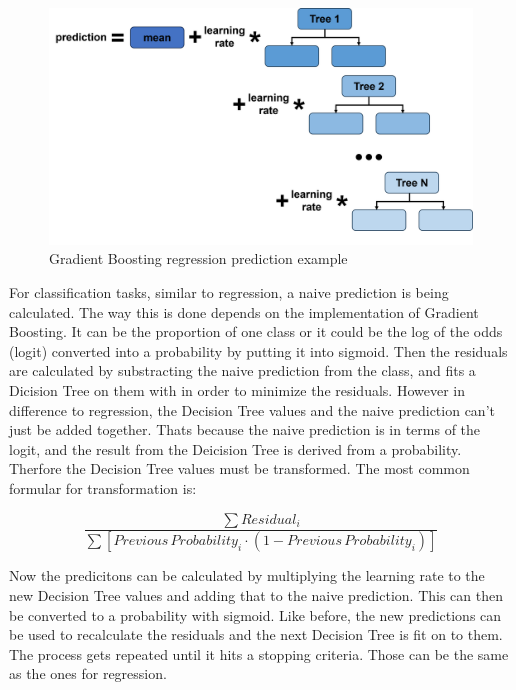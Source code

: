 \begin{figure}[htbp]
    \centering
    \includegraphics[width=.8\textwidth]{figures/gradient_boosting_prediction}
    \caption{Gradient Boosting regression prediction example}
\end{figure}

For classification tasks, similar to regression, a naive prediction is being calculated.
The way this is done depends on the implementation of Gradient Boosting. It can be the proportion of one
class or it could be the log of the odds (logit) converted into a probability by putting it into sigmoid.
Then the residuals are calculated by substracting the naive prediction from the class, and fits a Dicision
Tree on them with in order to minimize the residuals.
However in difference to regression, the Decision Tree values and the naive prediction can't just be added
together. Thats because the naive prediction is in terms of the logit, and the result from the Deicision Tree is
derived from a probability. Therfore the Decision Tree values must be transformed. The most common formular for
transformation is:

$$\frac{\sum Residual_i}{\sum [Previous \, Probability_i \cdot (1 - Previous \, Probability_i)]}$$

Now the predicitons can be calculated by multiplying the learning rate to the new Decision Tree values and
adding that to the naive prediction. This can then be converted to a probability with sigmoid.
Like before, the new predictions can be used to recalculate the residuals and the next Decision Tree is fit on to them.
The process gets repeated until it hits a stopping criteria. Those can be the same as the ones for regression.

